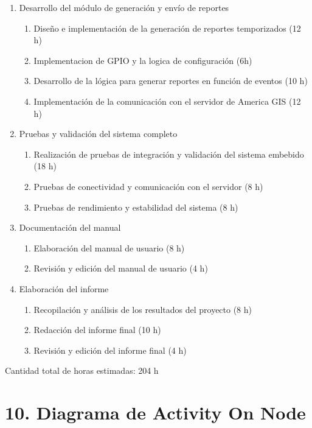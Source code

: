 \documentclass[
11pt, %
codirector, %
]{charter}
\begin{document}
\begin{enumerate}
    \item Desarrollo del módulo de generación y envío de reportes
    \begin{enumerate}
        \item Diseño e implementación de la generación de reportes temporizados (12 h)
        \item Implementacion de GPIO y la logica de configuración (6h)
        \item Desarrollo de la lógica para generar reportes en función de eventos (10 h)
        \item Implementación de la comunicación con el servidor de America GIS (12 h)
    \end{enumerate}
    
    \item Pruebas y validación del sistema completo
    \begin{enumerate}
        \item Realización de pruebas de integración y validación del sistema embebido (18 h)
        \item Pruebas de conectividad y comunicación con el servidor (8 h)
        \item Pruebas de rendimiento y estabilidad del sistema (8 h)
    \end{enumerate}
    
    \item Documentación del manual
    \begin{enumerate}
        \item Elaboración del manual de usuario (8 h)
        \item Revisión y edición del manual de usuario (4 h)
    \end{enumerate}
    
    \item Elaboración del informe
    \begin{enumerate}
        \item Recopilación y análisis de los resultados del proyecto (8 h)
        \item Redacción del informe final (10 h)
        \item Revisión y edición del informe final (4 h)
    \end{enumerate}
\end{enumerate}

Cantidad total de horas estimadas: 204 h


\section{10. Diagrama de Activity On Node}
\label{sec:AoN}
\end{document}
